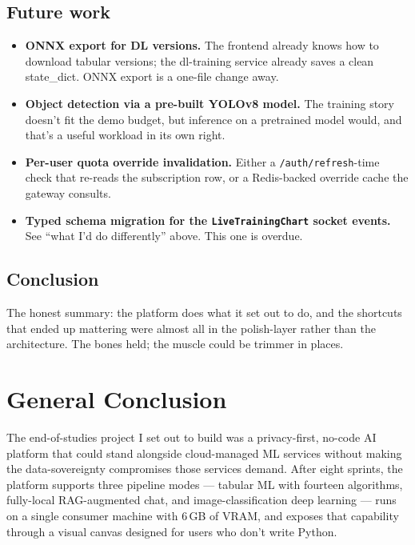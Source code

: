 \documentclass[12pt, a4paper]{report}
\begin{document}
\section{Future work}

\begin{itemize}
    \item \textbf{ONNX export for DL versions.} The frontend already
        knows how to download tabular versions; the dl-training
        service already saves a clean state\_dict. ONNX export is a
        one-file change away.
    \item \textbf{Object detection via a pre-built YOLOv8 model.} The
        training story doesn't fit the demo budget, but inference on
        a pretrained model would, and that's a useful workload in
        its own right.
    \item \textbf{Per-user quota override invalidation.} Either a
        \texttt{/auth/refresh}-time check that re-reads the
        subscription row, or a Redis-backed override cache the
        gateway consults.
    \item \textbf{Typed schema migration for the
        \texttt{LiveTrainingChart} socket events.} See ``what I'd
        do differently'' above. This one is overdue.
\end{itemize}

\section*{Conclusion}

The honest summary: the platform does what it set out to do, and the
shortcuts that ended up mattering were almost all in the polish-layer
rather than the architecture. The bones held; the muscle could be
trimmer in places.

\chapter*{General Conclusion}

The end-of-studies project I set out to build was a privacy-first,
no-code AI platform that could stand alongside cloud-managed ML
services without making the data-sovereignty compromises those
services demand. After eight sprints, the platform supports three
pipeline modes --- tabular ML with fourteen algorithms, fully-local
RAG-augmented chat, and image-classification deep learning --- runs
on a single consumer machine with $6$\,GB of VRAM, and exposes that
capability through a visual canvas designed for users who don't write
Python.
\end{document}
